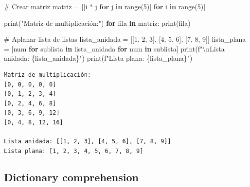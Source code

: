 \documentclass[
  doc,
  floatsintext,
  longtable,
  a4paper,
  nolmodern,
  notxfonts,
  notimes,
  12pt,
  colorlinks=true,linkcolor=blue,citecolor=blue,urlcolor=blue]{apa7}
\newenvironment{Shaded}{\begin{snugshade}}{\end{snugshade}}
\newcommand{\BuiltInTok}[1]{\textcolor[rgb]{0.00,0.23,0.31}{#1}}
\newcommand{\CharTok}[1]{\textcolor[rgb]{0.13,0.47,0.30}{#1}}
\newcommand{\CommentTok}[1]{\textcolor[rgb]{0.37,0.37,0.37}{#1}}
\newcommand{\ControlFlowTok}[1]{\textcolor[rgb]{0.00,0.23,0.31}{\textbf{#1}}}
\newcommand{\DecValTok}[1]{\textcolor[rgb]{0.68,0.00,0.00}{#1}}
\newcommand{\KeywordTok}[1]{\textcolor[rgb]{0.00,0.23,0.31}{\textbf{#1}}}
\newcommand{\NormalTok}[1]{\textcolor[rgb]{0.00,0.23,0.31}{#1}}
\newcommand{\OperatorTok}[1]{\textcolor[rgb]{0.37,0.37,0.37}{#1}}
\newcommand{\SpecialCharTok}[1]{\textcolor[rgb]{0.37,0.37,0.37}{#1}}
\newcommand{\SpecialStringTok}[1]{\textcolor[rgb]{0.13,0.47,0.30}{#1}}
\newcommand{\StringTok}[1]{\textcolor[rgb]{0.13,0.47,0.30}{#1}}
\begin{document}
\begin{Shaded}
\begin{Highlighting}[]
\CommentTok{\# Crear matriz}
\NormalTok{matriz }\OperatorTok{=}\NormalTok{ [[i }\OperatorTok{*}\NormalTok{ j }\ControlFlowTok{for}\NormalTok{ j }\KeywordTok{in} \BuiltInTok{range}\NormalTok{(}\DecValTok{5}\NormalTok{)] }\ControlFlowTok{for}\NormalTok{ i }\KeywordTok{in} \BuiltInTok{range}\NormalTok{(}\DecValTok{5}\NormalTok{)]}

\BuiltInTok{print}\NormalTok{(}\StringTok{"Matriz de multiplicación:"}\NormalTok{)}
\ControlFlowTok{for}\NormalTok{ fila }\KeywordTok{in}\NormalTok{ matriz:}
    \BuiltInTok{print}\NormalTok{(fila)}

\CommentTok{\# Aplanar lista de listas}
\NormalTok{lista\_anidada }\OperatorTok{=}\NormalTok{ [[}\DecValTok{1}\NormalTok{, }\DecValTok{2}\NormalTok{, }\DecValTok{3}\NormalTok{], [}\DecValTok{4}\NormalTok{, }\DecValTok{5}\NormalTok{, }\DecValTok{6}\NormalTok{], [}\DecValTok{7}\NormalTok{, }\DecValTok{8}\NormalTok{, }\DecValTok{9}\NormalTok{]]}
\NormalTok{lista\_plana }\OperatorTok{=}\NormalTok{ [num }\ControlFlowTok{for}\NormalTok{ sublista }\KeywordTok{in}\NormalTok{ lista\_anidada }\ControlFlowTok{for}\NormalTok{ num }\KeywordTok{in}\NormalTok{ sublista]}
\BuiltInTok{print}\NormalTok{(}\SpecialStringTok{f"}\CharTok{\textbackslash{}n}\SpecialStringTok{Lista anidada: }\SpecialCharTok{\{}\NormalTok{lista\_anidada}\SpecialCharTok{\}}\SpecialStringTok{"}\NormalTok{)}
\BuiltInTok{print}\NormalTok{(}\SpecialStringTok{f"Lista plana: }\SpecialCharTok{\{}\NormalTok{lista\_plana}\SpecialCharTok{\}}\SpecialStringTok{"}\NormalTok{)}
\end{Highlighting}
\end{Shaded}

\begin{verbatim}
Matriz de multiplicación:
[0, 0, 0, 0, 0]
[0, 1, 2, 3, 4]
[0, 2, 4, 6, 8]
[0, 3, 6, 9, 12]
[0, 4, 8, 12, 16]

Lista anidada: [[1, 2, 3], [4, 5, 6], [7, 8, 9]]
Lista plana: [1, 2, 3, 4, 5, 6, 7, 8, 9]
\end{verbatim}

\subsection{Dictionary comprehension}\label{dictionary-comprehension}
\end{document}
